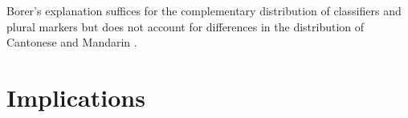 \documentclass[output=paper]{langsci/langscibook}
\begin{document}
\begin{exe}
\ex\label{ex:23.14}
{\premulticols=0pt\postmulticols=0pt
\begin{multicols}{2}\raggedcolumns
\begin{xlist}
\ex\relax [+\Clf{} −\Pl]\\
\columnbreak
    \ex\relax [−\Clf{} +\Pl]\\
\end{xlist}
\end{multicols}}
\end{exe}

Borer’s explanation suffices for the complementary distribution of classifiers
and plural markers but does not account for differences in the distribution of
Cantonese and Mandarin .

\section{Implications}
\end{document}
